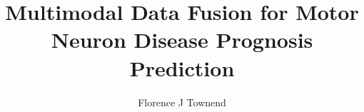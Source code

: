 
\title{Multimodal Data Fusion for Motor Neuron Disease Prognosis Prediction}
\author{Florence J Townend}

\maketitle
\makedeclaration

